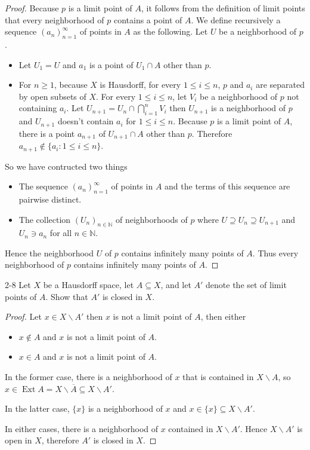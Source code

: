 \begin{proof}
	Because $p$ is a limit point of $A$, it follows from the definition of limit points that every neighborhood of $p$ contains a point of $A$. We define recursively a sequence ${(a_{n})}^{\infty}_{n=1}$ of points in $A$ as the following. Let $U$ be a neighborhood of $p$.

	\begin{itemize}
		\item Let $U_{1} = U$ and $a_{1}$ is a point of $U_{1}\cap A$ other than $p$.
		\item For $n\geq 1$, because $X$ is Hausdorff, for every $1\leq i\leq n$, $p$ and $a_{i}$ are separated by open subsets of $X$. For every $1\leq i\leq n$, let $V_{i}$ be a neighborhood of $p$ not containing $a_{i}$. Let $U_{n+1} = U_{n}\cap\bigcap^{n}_{i=1}V_{i}$ then $U_{n+1}$ is a neighborhood of $p$ and $U_{n+1}$ doesn't contain $a_{i}$ for $1\leq i\leq n$. Because $p$ is a limit point of $A$, there is a point $a_{n+1}$ of $U_{n+1}\cap A$ other than $p$. Therefore $a_{n+1}\notin\{ a_{i}: 1\leq i\leq n \}$.
	\end{itemize}

	So we have contructed two things
	\begin{itemize}
		\item The sequence ${(a_{n})}^{\infty}_{n=1}$ of points in $A$ and the terms of this sequence are pairwise distinct.
		\item The collection ${(U_{n})}_{n\in\mathbb{N}}$ of neighborhoods of $p$ where $U\supseteq U_{n}\supseteq U_{n+1}$ and $U_{n}\ni a_{n}$ for all $n\in\mathbb{N}$.
	\end{itemize}

	Hence the neighborhood $U$ of $p$ contains infinitely many points of $A$. Thus every neighborhood of $p$ contains infinitely many points of $A$.
\end{proof}

\begin{problem}{2-8}
Let $X$ be a Hausdorff space, let $A\subseteq X$, and let $A'$ denote the set of limit points of $A$. Show that $A'$ is closed in $X$.
\end{problem}

\begin{proof}
	Let $x\in X\smallsetminus A'$ then $x$ is not a limit point of $A$, then either
	\begin{itemize}
		\item $x\notin A$ and $x$ is not a limit point of $A$.
		\item $x\in A$ and $x$ is not a limit point of $A$.
	\end{itemize}

	In the former case, there is a neighborhood of $x$ that is contained in $X\smallsetminus A$, so $x\in \operatorname{Ext}A = X\smallsetminus\overline{A}\subseteq X\smallsetminus A'$.

	In the latter case, $\{ x \}$ is a neighborhood of $x$ and $x\in\{ x \}\subseteq X\smallsetminus A'$.

	In either cases, there is a neighborhood of $x$ contained in $X\smallsetminus A'$. Hence $X\smallsetminus A'$ is open in $X$, therefore $A'$ is closed in $X$.
\end{proof}

